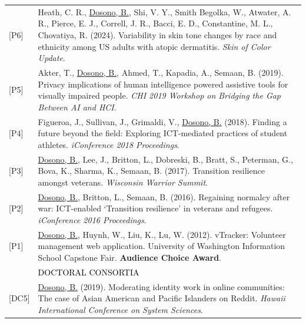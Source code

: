 \documentclass[12pt]{article}
\begin{document}
{\begin{longtable}{R{0.75in}p{5.0in}}
\footnotesize{[P6]} & Heath, C. R., \href{https://skinofcolorupdate.com/posters/}{Dosono, B.}, Shi, V. Y., Smith Begolka, W., Atwater, A. R., Pierce, E. J., Correll, J. R., Bacci, E. D., Constantine, M. L., Chovatiya, R. (2024). Variability in skin tone changes by race and ethnicity among US adults with atopic dermatitis. \textit{Skin of Color Update}.\\

\footnotesize{[P5]} & Akter, T., \href{https://www.usenix.org/sites/default/files/soups2019posters-akter.pdf}{Dosono, B.}, Ahmed, T., Kapadia, A., Semaan, B. (2019). Privacy implications of human intelligence powered assistive tools for visually impaired people. \textit{CHI 2019 Workshop on Bridging the Gap Between AI and HCI}.\\

\footnotesize{[P4]} & Figueroa, J., Sullivan, J., Grimaldi, V., \href{https://www.ideals.illinois.edu/handle/2142/100251}{Dosono, B.} (2018). Finding a future beyond the field: Exploring ICT-mediated practices of student athletes. \textit{iConference 2018 Proceedings}.\\

\footnotesize{[P3]} & \href{https://dryhootchpartners4health.org/wp-content/uploads/2017/09/Warrior-Summit-Program.pdf}{Dosono, B.}, Lee, J., Britton, L., Dobreski, B., Bratt, S., Peterman, G., Bova, K., Sharma, K., Semaan, B. (2017). Transition resilience amongst veterans. \textit{Wisconsin Warrior Summit}.\\

\footnotesize{[P2]} & \href{https://doi.org/10.9776/16575}{Dosono, B.}, Britton, L., Semaan, B. (2016). Regaining normalcy after war: ICT-enabled `Transition resilience' in veterans and refugees. \textit{iConference 2016 Proceedings}.\\

\footnotesize{[P1]} & \href{https://youtu.be/i5US90lHIac}{Dosono, B.}, Huynh, W., Liu, K., Lu, W. (2012). vTracker: Volunteer management web application. University of Washington Information School Capstone Fair. \textbf{Audience Choice Award}. \medskip \\

& \large \textcolor{black}{\uppercase{Doctoral Consortia}}\\

\footnotesize{[DC5]} 
& \href{https://web.archive.org/web/20200229145141/https://hicss.hawaii.edu/doctoral-consortium/}{Dosono, B.} (2019). Moderating identity work in online communities: The case of Asian American and Pacific Islanders on Reddit. \textit{Hawaii International Conference on System Sciences}.\\


\end{longtable}}
\end{document}
